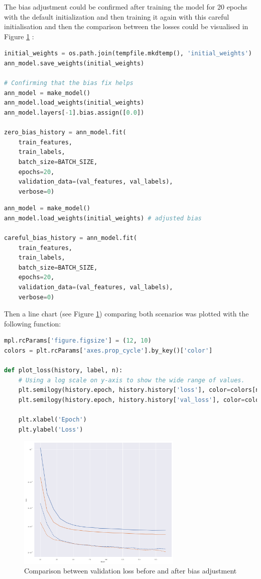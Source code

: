 \documentclass{article}
\begin{document}
The bias adjustment could be confirmed after training the model for 20 epochs with the default initialization and then training it again with this careful initialisation and then the comparison between the losses could be visualised in Figure \ref{fig:loss_vs_epochs} :

\begin{lstlisting}[language=Python]
initial_weights = os.path.join(tempfile.mkdtemp(), 'initial_weights')
ann_model.save_weights(initial_weights)

# Confirming that the bias fix helps
ann_model = make_model()
ann_model.load_weights(initial_weights)
ann_model.layers[-1].bias.assign([0.0]) 

zero_bias_history = ann_model.fit(
    train_features,
    train_labels,
    batch_size=BATCH_SIZE,
    epochs=20,
    validation_data=(val_features, val_labels), 
    verbose=0)
\end{lstlisting}

\begin{lstlisting}[language=Python]
ann_model = make_model()
ann_model.load_weights(initial_weights) # adjusted bias

careful_bias_history = ann_model.fit(
    train_features,
    train_labels,
    batch_size=BATCH_SIZE,
    epochs=20,
    validation_data=(val_features, val_labels), 
    verbose=0)
\end{lstlisting}

Then a line chart (see Figure \ref{fig:loss_vs_epochs}) comparing both scenarios was plotted with the following function:
\begin{lstlisting}[language=Python]
mpl.rcParams['figure.figsize'] = (12, 10)
colors = plt.rcParams['axes.prop_cycle'].by_key()['color']

def plot_loss(history, label, n):
    # Using a log scale on y-axis to show the wide range of values.
    plt.semilogy(history.epoch, history.history['loss'], color=colors[n], label='Train ' + label) 
    plt.semilogy(history.epoch, history.history['val_loss'], color=colors[n], label='Val ' + label, linestyle="--")
    
    plt.xlabel('Epoch')
    plt.ylabel('Loss')
\end{lstlisting}

\begin{figure}
\centering
\includegraphics[width=0.7\textwidth]{loss_vs_epochs.png}
\caption{\label{fig:loss_vs_epochs}Comparison between validation loss before and after bias adjustment}
\end{figure}
\end{document}
